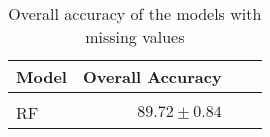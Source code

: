 \begin{table}[!htbp]
  \centering
    \begin{tabular}{lrrr}
    Model                       & Overall Accuracy             \\[0.2cm] 
    \hline \\[-0.2cm]
    RF  & $89.72 \pm 0.84$
    \end{tabular}
  \caption{Overall accuracy of the models with missing values} 
\end{table}